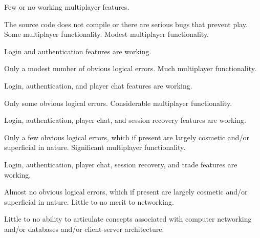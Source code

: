 \documentclass{../../fal_assignment}
\begin{document}
\begin{markingrubric}
%
%
        \grade\fail 	Few or no working multiplayer features.
            \par 		The source code does not compile or there are serious bugs that prevent play.
        \grade 		Some multiplayer functionality.
        \grade 		Modest multiplayer functionality.
            \par		Login and authentication features are working.
            \par 		Only a modest number of obvious logical errors. 
        \grade 		Much multiplayer functionality.
            \par		Login, authentication, and player chat features are working.
            \par 		Only some obvious logical errors. 
        \grade 		Considerable multiplayer functionality.
            \par		Login, authentication, player chat, and session recovery features are working.
            \par 		Only a few obvious logical errors, which if present are largely cosmetic and/or superficial in nature.
        \grade 		Significant multiplayer functionality.
            \par		Login, authentication, player chat, session recovery, and trade features are working.
            \par 		Almost no obvious logical errors, which if present are largely cosmetic and/or superficial in nature.
%
        \grade\fail Little to no merit to networking.
            \par Little to no ability to articulate concepts associated with computer networking and/or databases and/or client-server architecture.

\end{markingrubric}
\end{document}
